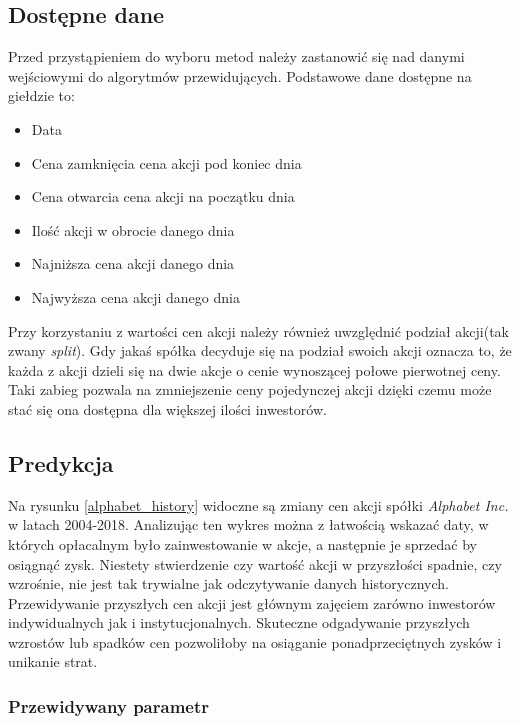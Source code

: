 \documentclass[a4paper, twoside, 11pt, openright]{article}
\begin{document}
\subsection{Dostępne dane}

Przed przystąpieniem do wyboru metod należy zastanowić się nad danymi wejściowymi do algorytmów przewidujących. Podstawowe dane dostępne na giełdzie to:
\begin{itemize}
\item{Data}
\item{Cena zamknięcia} cena akcji pod koniec dnia
\item{Cena otwarcia} cena akcji na początku dnia
\item{Ilość akcji w obrocie danego dnia}
\item{Najniższa cena akcji danego dnia}
\item{Najwyższa cena akcji danego dnia}
\end{itemize}

 Przy korzystaniu z wartości cen akcji należy również uwzględnić podział akcji(tak zwany \textit{split}). Gdy jakaś spółka decyduje się na podział swoich akcji oznacza to, że każda z akcji dzieli się na dwie akcje o cenie wynoszącej połowe pierwotnej ceny. Taki zabieg pozwala na zmniejszenie ceny pojedynczej akcji dzięki czemu może stać się ona dostępna dla większej ilości inwestorów. 


\subsection{Predykcja}

Na rysunku \ref{alphabet_history} widoczne są zmiany cen akcji spółki \textit{Alphabet Inc.} w latach 2004-2018. Analizując ten wykres można z łatwością wskazać daty, w których opłacalnym było zainwestowanie w akcje, a następnie je sprzedać by osiągnąć zysk. Niestety stwierdzenie czy wartość akcji w przyszłości spadnie, czy wzrośnie, nie jest tak trywialne jak odczytywanie danych historycznych. Przewidywanie przyszłych cen akcji jest głównym zajęciem zarówno inwestorów indywidualnych jak i instytucjonalnych. Skuteczne odgadywanie przyszłych wzrostów lub spadków cen pozwoliłoby na osiąganie ponadprzeciętnych zysków i unikanie strat.


\subsubsection{Przewidywany parametr}
\end{document}
